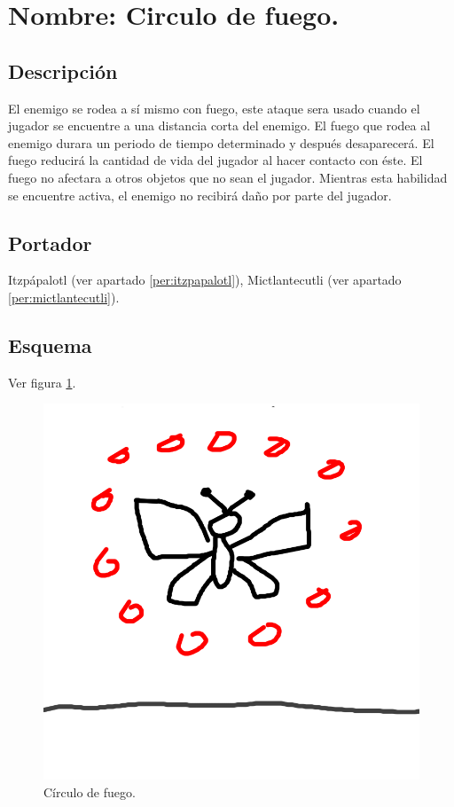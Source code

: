 \section{Nombre: Circulo de fuego.} \label{hab.CirFue}
\subsection{Descripción}
El enemigo se rodea a sí mismo con fuego, este ataque sera usado cuando el jugador se encuentre a una distancia corta del enemigo. El fuego que rodea al enemigo durara un periodo de tiempo determinado y después desaparecerá. El fuego reducirá la cantidad de vida del jugador al hacer contacto con éste. El fuego no afectara a otros objetos que no sean el jugador. Mientras esta habilidad se encuentre activa, el enemigo no recibirá daño por parte del jugador.
\subsection{Portador}
Itzpápalotl (ver apartado \ref{per:itzpapalotl}),  Mictlantecutli (ver apartado \ref{per:mictlantecutli}). 
\subsection{Esquema}
			Ver figura \ref{fig:circuloF}.
			\begin{figure}
				\centering
				\includegraphics[height=0.2 \textheight]{Imagenes/circuloF}
				\caption{Círculo de fuego.}
				\label{fig:circuloF}
			\end{figure}
			